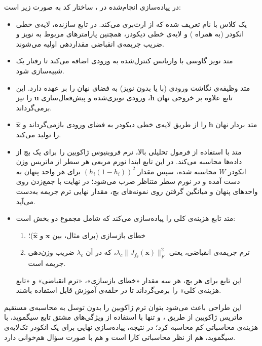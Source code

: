 \documentclass{article}
\begin{document}
در پیاده‌سازی انجام‌شده در ، ساختار کد به صورت زیر است:

\begin{itemize}
	\item یک کلاس با نام  تعریف شده که از 
	ارث‌بری می‌کند. در تابع سازنده، لایه‌ی خطی انکودر (به همراه ) و لایه‌ی خطی
	دیکودر، همچنین پارامترهای مربوط به نویز و ضریب جریمه‌ی انقباضی مقداردهی اولیه می‌شوند.
	
	\item متد  نویز گاوسی با واریانس کنترل‌شده به ورودی اضافه می‌کند تا رفتار یک
	 شبیه‌سازی شود.
	
	\item متد  وظیفه‌ی نگاشت ورودی (با یا بدون نویز) به فضای نهان را بر عهده دارد. این تابع
	علاوه بر خروجی نهان $\mathbf{h}$، ورودی نویزی‌شده و پیش‌فعال‌سازی $\mathbf{u}$ را نیز برمی‌گرداند.
	
	\item متد  بردار نهان $\mathbf{h}$ را از طریق لایه‌ی خطی دیکودر به فضای ورودی بازمی‌گرداند
	و $\hat{\mathbf{x}}$ را تولید می‌کند.
	
	\item متد  با استفاده از فرمول تحلیلی بالا، نرم فروبنیوس ژاکوبین را برای
	یک بچ از داده‌ها محاسبه می‌کند. در این تابع ابتدا نورم مربعی هر سطر از ماتریس وزن انکودر $W$ محاسبه
	شده، سپس مقدار $(h_i (1 - h_i))^2$ برای هر واحد پنهان به دست آمده و در نورم سطر متناظر ضرب می‌شود؛
	در نهایت با جمع‌زدن روی واحدهای پنهان و میانگین گرفتن روی نمونه‌های بچ، مقدار نهایی ترم جریمه به‌دست می‌آید.
	
	\item متد  تابع هزینه‌ی کلی را پیاده‌سازی می‌کند که شامل مجموع دو بخش است:
	\begin{enumerate}
		\item خطای بازسازی (برای مثال،  بین $\mathbf{x}$ و $\hat{\mathbf{x}}$)؛
		\item ترم جریمه‌ی انقباضی، یعنی $\lambda_c \|J_{f_\theta}(\mathbf{x})\|_F^2$،
		که در آن $\lambda_c$ ضریب وزن‌دهی جریمه است.
	\end{enumerate}
	این تابع برای هر بچ، هر سه مقدار «خطای بازسازی»، «ترم انقباضی» و «تابع هزینه‌ی کلی»
	را برمی‌گرداند تا در حلقه‌ی آموزش قابل استفاده باشند.
\end{itemize}

این طراحی باعث می‌شود بتوان ترم ژاکوبین را بدون توسل به محاسبه‌ی مستقیم ماتریس ژاکوبین از طریق
، و تنها با استفاده از ویژگی‌های مشتق تابع سیگموید، با هزینه‌ی محاسباتی کم محاسبه کرد؛
در نتیجه، پیاده‌سازی نهایی برای یک انکودر تک‌لایه‌ی سیگموید، هم از نظر محاسباتی کارا است و هم
با صورت سؤال هم‌خوانی دارد.
\end{document}
